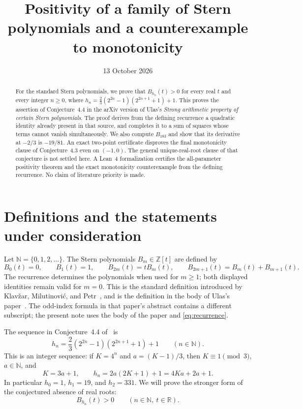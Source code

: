 \documentclass[11pt]{article}
\title{Positivity of a family of Stern polynomials\newline
and a counterexample to monotonicity}
\author{}
\date{13 October 2026}
\theoremstyle{remark}
\newcommand{\N}{\mathbb{N}}
\newcommand{\R}{\mathbb{R}}
\newcommand{\Z}{\mathbb{Z}}
\begin{document}
\maketitle
\begin{abstract}
For the standard Stern polynomials, we prove that
$B_{h_n}(t)>0$ for every real $t$ and every integer $n\geq0$, where
$h_n=\frac23(2^{2n}-1)(2^{2n+1}+1)+1$.
This proves the assertion of Conjecture~4.4 in the arXiv version of
Ulas's \emph{Strong arithmetic property of certain Stern polynomials}.
The proof derives from the defining recurrence a quadratic identity already
present in that source, and completes it to a sum of squares whose terms
cannot vanish simultaneously. We also compute $B_{183}$ and show that its
derivative at $-2/3$ is $-19/81$. An exact two-point certificate disproves
the final monotonicity clause of Conjecture~4.3 even on $(-1,0)$.
The general unique-real-root clause of that conjecture is not settled here.
A Lean~4 formalization certifies the all-parameter positivity theorem and
the exact monotonicity counterexample from the defining recurrence.
No claim of literature priority is made.
\end{abstract}

\section{Definitions and the statements under consideration}
Let $\N=\{0,1,2,\ldots\}$. The Stern polynomials $B_m\in\Z[t]$ are
defined by
\begin{equation}\label{eq:recurrence}
 B_0(t)=0,\qquad B_1(t)=1,\qquad
 B_{2m}(t)=tB_m(t),\qquad
 B_{2m+1}(t)=B_m(t)+B_{m+1}(t).
\end{equation}
The recurrence determines the polynomials when used for $m\geq1$;
both displayed identities remain valid for $m=0$.
This is the standard definition introduced by Klav\v{z}ar,
Milutinovi\'{c}, and Petr~\cite{KMP}, and is the definition in the body
of Ulas's paper~\cite[p.~2]{Ulas}. The odd-index formula in that paper's
abstract contains a different subscript; the present note uses the body
of the paper and \eqref{eq:recurrence}.

The sequence in Conjecture~4.4 of~\cite[p.~16]{Ulas} is
\begin{equation}\label{eq:h}
 h_n=\frac23(2^{2n}-1)(2^{2n+1}+1)+1\qquad(n\in\N).
\end{equation}
This is an integer sequence: if $K=4^n$ and $a=(K-1)/3$, then
$K\equiv1\pmod3$, $a\in\N$, and
\begin{equation}\label{eq:indices}
 K=3a+1,\qquad h_n=2a(2K+1)+1=4Ka+2a+1.
\end{equation}
In particular $h_0=1$, $h_1=19$, and $h_2=331$.
We will prove the stronger form of the conjectured absence of real roots:
\begin{equation}\label{eq:positive-goal}
 B_{h_n}(t)>0\qquad(n\in\N,\ t\in\R).
\end{equation}
\end{document}
